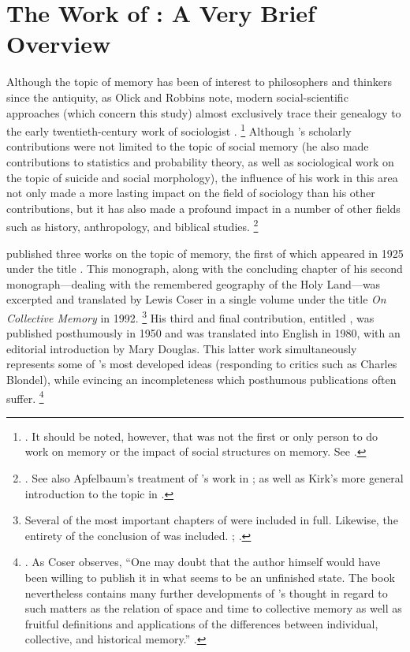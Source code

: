 \section{The Work of \Halbwachs: A Very Brief Overview}

Although the topic of memory has been of interest to philosophers and thinkers since the antiquity,%
    \autocite{carruthers_radstone-schwarz2011}
as Olick and Robbins note, modern social-scientific approaches (which concern this study) almost exclusively trace their genealogy to the early twentieth-century work of sociologist \Halbwachs.%
    \footnote{%
        \cite[106]{olick-robbins_ars1998}.
        It should be noted, however, that \halbwachs was not the first or only person to do work on memory or the impact of social structures on memory. See 
        \cite[8--36]{olick_olick-etal2011}.}
Although \halbwachs's scholarly contributions were not limited to the topic of social memory (he also made contributions to statistics and probability theory, as well as sociological work on the topic of suicide and social morphology), the influence of his work in this area not only made a more lasting impact on the field of sociology than his other contributions, but it has also made a profound impact in a number of other fields such as history, anthropology, and biblical studies.%
    \footnote{%
        \Cite[13--20]{coser_halbwachs1992}. See also Apfelbaum's treatment of \halbwachs's work in 
        \cite{apfelbaum_radstone-schwarz2011}; as well as Kirk's more general introduction to the topic in
        \cite{kirk_kirk-thatcher2005}.}

\halbwachs published three works on the topic of memory, the first of which appeared in 1925 under the title .%
    \autocite{halbwachs1925}
This monograph, along with the concluding chapter of his second monograph---dealing with the remembered geography of the Holy Land---was excerpted and translated by Lewis Coser in a single volume under the title \emph{On Collective Memory} in 1992.%
    \footnote{%
        Several of the most important chapters of  were included in full. Likewise, the entirety of the conclusion of  was included. 
        \cite{halbwachs1992};
        \cite{halbwachs1941}.}
His third and final contribution, entitled , was published posthumously in 1950 and was translated into English in 1980, with an editorial introduction by Mary Douglas.%
    \autocite{halbwachs1980}
This latter work simultaneously represents some of \halbwachs's most developed ideas (responding to critics such as Charles Blondel), while evincing an incompleteness which posthumous publications often suffer.%
    \footnote{%
        \Cite{halbwachs1980}. 
        As Coser observes, ``One may doubt that the author himself would have been willing to publish it in what seems to be an unfinished state. The book nevertheless contains many further developments of \halbwachs's thought in regard to such matters as the relation of space and time to collective memory as well as fruitful definitions and applications of the differences between individual, collective, and historical memory.''
        \cite[2]{coser_halbwachs1992}.}

